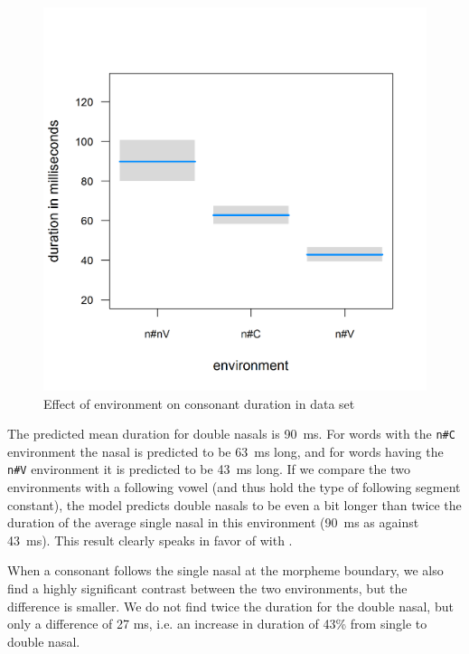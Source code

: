 \begin{figure}  
	
	\includegraphics [scale=0.4] {images/Corpus/unModelNumNasal.png}
	\caption{Effect of environment on consonant duration in data set}
	\label{fig:NumNasal un}
\end{figure}




The predicted mean duration for double nasals is 90~ms. For words with the \texttt{n\#C} environment the nasal is predicted to be 63~ms long, and for words having the \texttt{n\#V} environment it is predicted to be 43~ms long. If we compare the two environments with a following vowel (and thus hold the type of following segment constant), the model predicts double nasals to be even a bit longer than twice the duration of the average single nasal in this environment (90~ms as against 43~ms). This result clearly speaks in favor of  with .

When a consonant follows the single nasal at the morpheme boundary, we also find a highly significant contrast between the two environments, but the difference is smaller. We do not find twice the duration for the double nasal, but only a difference of 27 ms, i.e. an increase in duration of 43\% from single to double nasal. 


